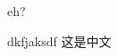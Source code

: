 \documentclass[a4paper, 12pt, AutoFakeBold]{article}
\date{}
\begin{document}


eh?

dkfjaksdf
\newpage
这是中文
\end{document}
